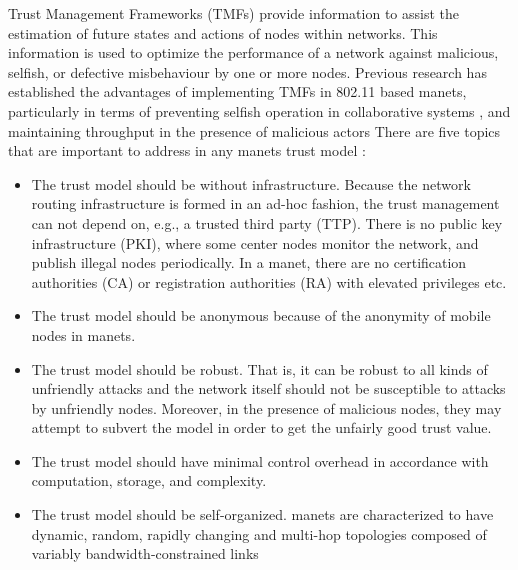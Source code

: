 Trust Management Frameworks (TMFs) provide information to assist the estimation of future states and actions of nodes within networks.
This information is used to optimize the performance of a network against malicious, selfish, or defective misbehaviour by one or more nodes.
Previous research has established the advantages of implementing TMFs in 802.11 based \gls{manet}s, particularly in terms of preventing selfish operation in collaborative systems \cite{Li2007}, and maintaining throughput in the presence of malicious actors \cite{Buchegger2002}
There are five topics that are important to address in any \gls{manet}s trust model \cite{Kamvar2003}:
\begin{itemize}
  \item The trust model should be without infrastructure.
    Because the network routing infrastructure is formed in an ad-hoc fashion, the trust management can not depend on, e.g., a trusted third party (TTP).
    There is no public key infrastructure (PKI), where some center nodes monitor the network, and publish illegal nodes periodically.
    In a \gls{manet}, there are no certification authorities (CA) or registration authorities (RA) with elevated privileges etc.
  \item The trust model should be anonymous because of the anonymity of mobile nodes in \gls{manet}s.
  \item The trust model should be robust.
    That is, it can be robust to all kinds of unfriendly attacks and the network itself should not be susceptible to attacks by unfriendly nodes.
    Moreover, in the presence of malicious nodes, they may attempt to subvert the model in order to get the unfairly good trust value.
  \item The trust model should have minimal control overhead in accordance with computation, storage, and complexity.
  \item The trust model should be self-organized.
    \gls{manet}s are characterized to have dynamic, random, rapidly changing and multi-hop topologies composed of variably bandwidth-constrained links
\end{itemize}
